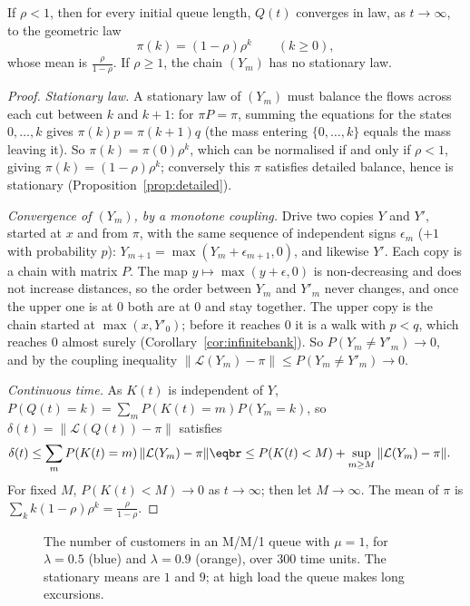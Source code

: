 \begin{theorem}[M/M/1]\label{thm:mm1}
If $\rho<1$, then for every initial queue length, $Q(t)$ converges in law, as $t\to\infty$, to the geometric law
\[
\pi(k)=(1-\rho)\rho^k\qquad(k\ge0),
\]
whose mean is $\frac\rho{1-\rho}$. If $\rho\ge1$, the chain $(Y_m)$ has no stationary law.
\end{theorem}
\begin{proof}
\emph{Stationary law.} A stationary law of $(Y_m)$ must balance the flows across each cut between $k$ and $k+1$: for $\pi P=\pi$, summing the
equations for the states $0,\dots,k$ gives $\pi(k)p=\pi(k+1)q$ (the mass entering $\{0,\dots,k\}$ equals the mass leaving it). So $\pi(k)=\pi(0)\rho^k$,
which can be normalised if and only if $\rho<1$, giving $\pi(k)=(1-\rho)\rho^k$; conversely this $\pi$ satisfies detailed balance, hence is stationary
(Proposition~\ref{prop:detailed}).

\emph{Convergence of $(Y_m)$, by a monotone coupling.} Drive two copies $Y$ and $Y'$, started at $x$ and from $\pi$, with the same sequence of
independent signs $\epsilon_m$ ($+1$ with probability $p$): $Y_{m+1}=\max(Y_m+\epsilon_{m+1},0)$, and likewise $Y'$. Each copy is a chain with matrix $P$. The map
$y\mapsto\max(y+\epsilon,0)$ is non-decreasing and does not increase distances, so the order between $Y_m$ and $Y'_m$ never changes, and once the upper
one is at $0$ both are at $0$ and stay together. The upper copy is the chain started at $\max(x,Y'_0)$; before it reaches $0$ it is a walk
with $p<q$, which reaches $0$ almost surely (Corollary~\ref{cor:infinitebank}). So $P(Y_m\ne Y'_m)\to0$, and by the coupling inequality
$\|\mathcal L(Y_m)-\pi\|\le P(Y_m\ne Y'_m)\to0$.

\emph{Continuous time.} As $K(t)$ is independent of $Y$, $P(Q(t)=k)=\sum_mP(K(t)=m)P(Y_m=k)$, so $\delta(t)=\|\mathcal L(Q(t))-\pi\|$ satisfies
\[
\begin{aligned}\delta(t)&\le\sum_mP(K(t)=m)\,\|\mathcal L(Y_m)-\pi\|\eqbr\le P(K(t)<M)+\sup_{m\ge M}\|\mathcal L(Y_m)-\pi\|.\end{aligned}
\]
For fixed $M$, $P(K(t)<M)\to0$ as $t\to\infty$; then let $M\to\infty$. The mean of $\pi$ is $\sum_kk(1-\rho)\rho^k=\frac\rho{1-\rho}$.
\end{proof}

\begin{figure}[ht]
\centering
{}
\caption{The number of customers in an M/M/1 queue with $\mu=1$, for $\lambda=0.5$ (blue) and $\lambda=0.9$ (orange), over $300$ time units. The
stationary means are $1$ and $9$; at high load the queue makes long excursions.}
\label{fig:mm1}
\end{figure}

